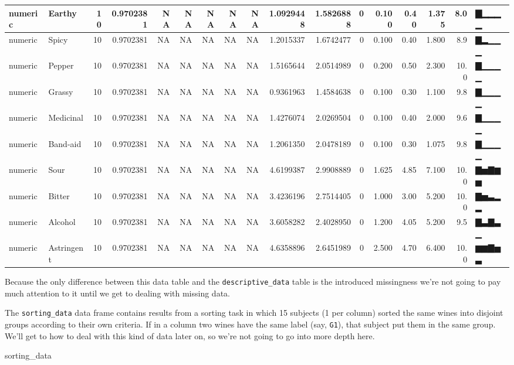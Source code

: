 \documentclass[
]{book}
\newenvironment{Shaded}{\begin{snugshade}}{\end{snugshade}}
\newcommand{\NormalTok}[1]{#1}
\begin{document}
\begin{tabular}{l|l|r|r|r|r|r|r|r|r|r|r|r|r|r|r|l}
\hline
numeric & Earthy & 10 & 0.9702381 & NA & NA & NA & NA & NA & 1.0929448 & 1.5826888 & 0 & 0.100 & 0.40 & 1.375 & 8.0 & ▇▁▁▁▁\\
\hline
numeric & Spicy & 10 & 0.9702381 & NA & NA & NA & NA & NA & 1.2015337 & 1.6742477 & 0 & 0.100 & 0.40 & 1.800 & 8.9 & ▇▂▁▁▁\\
\hline
numeric & Pepper & 10 & 0.9702381 & NA & NA & NA & NA & NA & 1.5165644 & 2.0514989 & 0 & 0.200 & 0.50 & 2.300 & 10.0 & ▇▁▁▁▁\\
\hline
numeric & Grassy & 10 & 0.9702381 & NA & NA & NA & NA & NA & 0.9361963 & 1.4584638 & 0 & 0.100 & 0.30 & 1.100 & 9.8 & ▇▁▁▁▁\\
\hline
numeric & Medicinal & 10 & 0.9702381 & NA & NA & NA & NA & NA & 1.4276074 & 2.0269504 & 0 & 0.100 & 0.40 & 2.000 & 9.6 & ▇▁▁▁▁\\
\hline
numeric & Band-aid & 10 & 0.9702381 & NA & NA & NA & NA & NA & 1.2061350 & 2.0478189 & 0 & 0.100 & 0.30 & 1.075 & 9.8 & ▇▁▁▁▁\\
\hline
numeric & Sour & 10 & 0.9702381 & NA & NA & NA & NA & NA & 4.6199387 & 2.9908889 & 0 & 1.625 & 4.85 & 7.100 & 10.0 & ▇▅▇▆▅\\
\hline
numeric & Bitter & 10 & 0.9702381 & NA & NA & NA & NA & NA & 3.4236196 & 2.7514405 & 0 & 1.000 & 3.00 & 5.200 & 10.0 & ▇▅▃▂▂\\
\hline
numeric & Alcohol & 10 & 0.9702381 & NA & NA & NA & NA & NA & 3.6058282 & 2.4028950 & 0 & 1.200 & 4.05 & 5.200 & 9.5 & ▇▃▇▃▁\\
\hline
numeric & Astringent & 10 & 0.9702381 & NA & NA & NA & NA & NA & 4.6358896 & 2.6451989 & 0 & 2.500 & 4.70 & 6.400 & 10.0 & ▆▆▇▅▃\\
\hline
\end{tabular}

Because the only difference between this data table and the \texttt{descriptive\_data} table is the introduced missingness we're not going to pay much attention to it until we get to dealing with missing data.

The \texttt{sorting\_data} data frame contains results from a sorting task in which 15 subjects (1 per column) sorted the same wines into disjoint groups according to their own criteria. If in a column two wines have the same label (say, \texttt{G1}), that subject put them in the same group. We'll get to how to deal with this kind of data later on, so we're not going to go into more depth here.

\begin{Shaded}
\begin{Highlighting}[]
\NormalTok{sorting\_data}
\end{Highlighting}
\end{Shaded}
\end{document}
